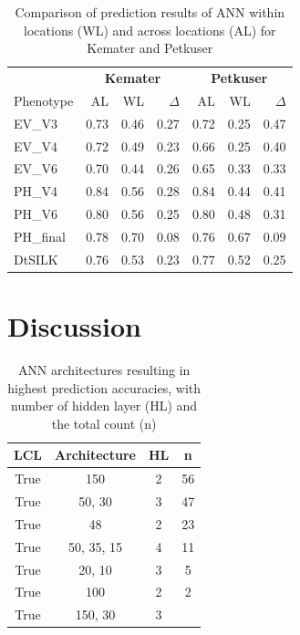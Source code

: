 \onehalfspacing
\begin{table}[H]
 \centering
 \caption[Comparison of prediction results of ANN within locations and across locations for Kemater and Petkuser]{Comparison of prediction results of ANN within locations (WL) and across locations (AL) for Kemater and Petkuser}
 \begin{tabular}{lrrr|rrr}
  \toprule
  & \multicolumn{3}{c}{\textbf{Kemater}} & \multicolumn{3}{c}{\textbf{Petkuser}} \\
  Phenotype & AL  & WL  & $\Delta$ & AL  & WL & $\Delta$ \\ 
  \midrule
  EV\_V3 & 0.73 & 0.46 & 0.27 & 0.72 & 0.25 & 0.47 \\ 
  EV\_V4 & 0.72 & 0.49 & 0.23 & 0.66 & 0.25 & 0.40 \\ 
  EV\_V6 & 0.70 & 0.44 & 0.26 & 0.65 & 0.33 & 0.33 \\ 
  PH\_V4 & 0.84 & 0.56 & 0.28 & 0.84 & 0.44 & 0.41 \\ 
  PH\_V6 & 0.80 & 0.56 & 0.25 & 0.80 & 0.48 & 0.31 \\ 
  PH\_final & 0.78 & 0.70 & 0.08 & 0.76 & 0.67 & 0.09 \\ 
  DtSILK & 0.76 & 0.53 & 0.23 & 0.77 & 0.52 & 0.25 \\ 
  \bottomrule
 \end{tabular}
\end{table}
\doublespacing

\section{Discussion}\label{gpdis}

\onehalfspacing
\begin{table}[H]
 \centering
 \caption[ANN architectures of ANN resulting in highest prediction accuracies]{ANN architectures resulting in highest prediction accuracies, with number of hidden layer (HL) and the total count (n)}
 \begin{tabular}{cccc}
 \toprule
  LCL & Architecture & HL & n \\ 
  \midrule
  True & 150    & 2 & 56 \\ 
  True & 50, 30   & 3 & 47 \\ 
  True & 48     & 2 & 23 \\ 
  True & 50, 35, 15 & 4 & 11 \\ 
  True & 20, 10   & 3 &  5 \\ 
  True & 100    & 2 &  2 \\ 
  True & 150, 30  & 3 & \\
   \bottomrule
\end{tabular}
\end{table}
\doublespacing